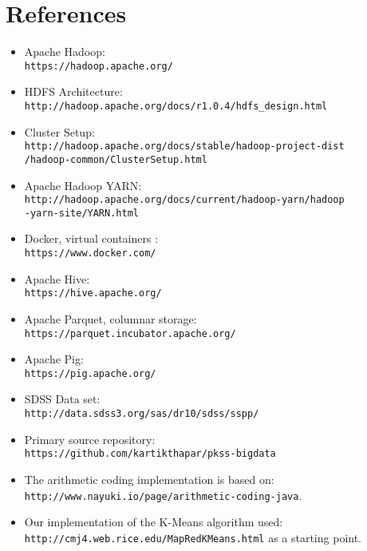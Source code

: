 \documentclass[paper=letter, fontsize=11pt]{scrartcl}
\numberwithin{equation}{section}		%
\numberwithin{figure}{section}			%
\numberwithin{table}{section}				%
\begin{document}
\section{References}
\begin{itemize}
\item Apache Hadoop: \\
    \texttt{https://hadoop.apache.org/}

\item HDFS Architecture: \\
    \texttt{http://hadoop.apache.org/docs/r1.0.4/hdfs\_design.html}

\item Cluster Setup: \\
    \texttt{http://hadoop.apache.org/docs/stable/hadoop-project-dist\\/hadoop-common/ClusterSetup.html}

\item Apache Hadoop YARN: \\
    \texttt{http://hadoop.apache.org/docs/current/hadoop-yarn/hadoop\\-yarn-site/YARN.html}
    
\item Docker, virtual containers :\\
    \texttt{https://www.docker.com/}

\item Apache Hive: \\
    \texttt{https://hive.apache.org/}

\item Apache Parquet, columnar storage: \\
    \texttt{https://parquet.incubator.apache.org/}

\item Apache Pig: \\
    \texttt{https://pig.apache.org/}

\item SDSS Data set: \\
    \texttt{http://data.sdss3.org/sas/dr10/sdss/sspp/}
    
\item Primary source repository:\\
    \texttt{https://github.com/kartikthapar/pkss-bigdata}

\item The arithmetic coding implementation is based on: \\
    \texttt{http://www.nayuki.io/page/arithmetic-coding-java}.

\item Our implementation of the K-Means algorithm used: \\ 
    \texttt{http://cmj4.web.rice.edu/MapRedKMeans.html} as a starting point.


\end{itemize}

\end{document}
